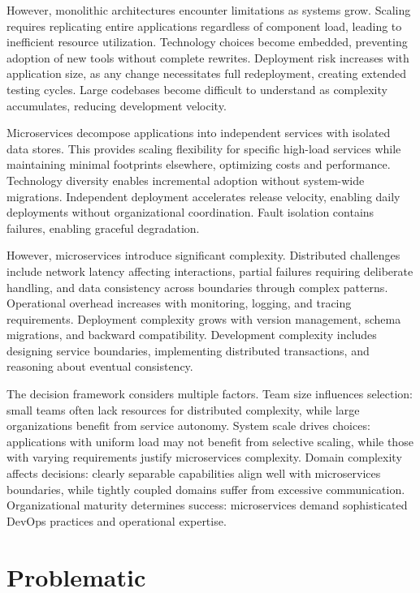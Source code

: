 \documentclass[a4paper, 12pt]{report}
\begin{document}
However, monolithic architectures encounter limitations as systems grow. Scaling requires replicating entire applications regardless of component load, leading to inefficient resource utilization. Technology choices become embedded, preventing adoption of new tools without complete rewrites. Deployment risk increases with application size, as any change necessitates full redeployment, creating extended testing cycles. Large codebases become difficult to understand as complexity accumulates, reducing development velocity.

Microservices decompose applications into independent services with isolated data stores. This provides scaling flexibility for specific high-load services while maintaining minimal footprints elsewhere, optimizing costs and performance. Technology diversity enables incremental adoption without system-wide migrations. Independent deployment accelerates release velocity, enabling daily deployments without organizational coordination. Fault isolation contains failures, enabling graceful degradation.

However, microservices introduce significant complexity. Distributed challenges include network latency affecting interactions, partial failures requiring deliberate handling, and data consistency across boundaries through complex patterns. Operational overhead increases with monitoring, logging, and tracing requirements. Deployment complexity grows with version management, schema migrations, and backward compatibility. Development complexity includes designing service boundaries, implementing distributed transactions, and reasoning about eventual consistency.

The decision framework considers multiple factors. Team size influences selection: small teams often lack resources for distributed complexity, while large organizations benefit from service autonomy. System scale drives choices: applications with uniform load may not benefit from selective scaling, while those with varying requirements justify microservices complexity. Domain complexity affects decisions: clearly separable capabilities align well with microservices boundaries, while tightly coupled domains suffer from excessive communication. Organizational maturity determines success: microservices demand sophisticated DevOps practices and operational expertise.

\section{Problematic}
\end{document}
